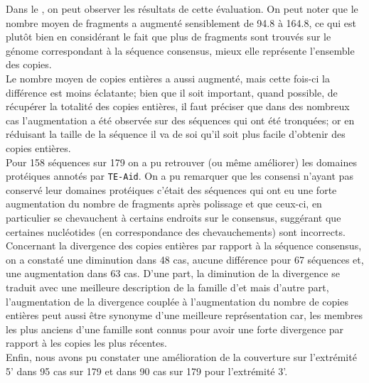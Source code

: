 \documentclass[10pt]{article}
\begin{document}
Dans le \tableautorefname{ \ref{tab:eval_poliste}}, on peut observer les résultats de cette évaluation. On peut noter que le nombre moyen de fragments a augmenté sensiblement de 94.8 à 164.8, ce qui est plutôt bien en considérant le fait que plus de fragments sont trouvés sur le génome correspondant à la séquence consensus, mieux elle représente l'ensemble des copies. \\
Le nombre moyen de copies entières a aussi augmenté, mais cette fois-ci la différence est moins éclatante; bien que il soit important, quand possible, de récupérer la totalité des copies entières, il faut préciser que dans des nombreux cas l'augmentation a été observée sur des séquences qui ont été tronquées; or en réduisant la taille de la séquence il va de soi qu'il soit plus facile d'obtenir des copies entières. \\
Pour 158 séquences sur 179 on a pu retrouver (ou même améliorer) les domaines protéiques annotés par \texttt{TE-Aid}. On a pu remarquer que les consensi n'ayant pas conservé leur domaines protéiques c'était des séquences qui ont eu une forte augmentation du nombre de fragments après polissage et que ceux-ci, en particulier se chevauchent à certains endroits sur le consensus, suggérant que certaines nucléotides (en correspondance des chevauchements) sont incorrects. \\
Concernant la divergence des copies entières par rapport à la séquence consensus, on a constaté une diminution dans 48 cas, aucune différence pour 67 séquences et, une augmentation dans 63 cas. D'une part, la diminution de la divergence se traduit avec une meilleure description de la famille d'\acrshort{et} mais d'autre part, l'augmentation de la divergence couplée à l'augmentation du nombre de copies entières peut aussi être synonyme d'une meilleure représentation car, les membres les plus anciens d'une famille sont connus pour avoir une forte divergence par rapport à les copies les plus récentes. \\
Enfin, nous avons pu constater une amélioration de la couverture sur l'extrémité 5' dans 95 cas sur 179 et dans 90 cas sur 179 pour l'extrémité 3'. \\

\bigskip
\end{document}
